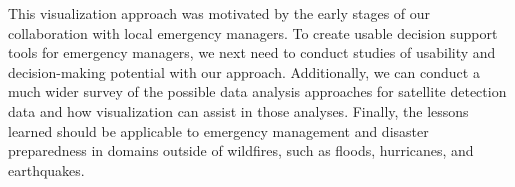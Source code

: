 This visualization approach was motivated by the early stages of our collaboration with local emergency managers. To create usable decision support tools for emergency managers, we next need to conduct studies of usability and decision-making potential with our approach. Additionally, we can conduct a much wider survey of the possible data analysis approaches for satellite detection data and how visualization can assist in those analyses. Finally, the lessons learned should be applicable to emergency management and disaster preparedness in domains outside of wildfires, such as floods, hurricanes, and earthquakes.

